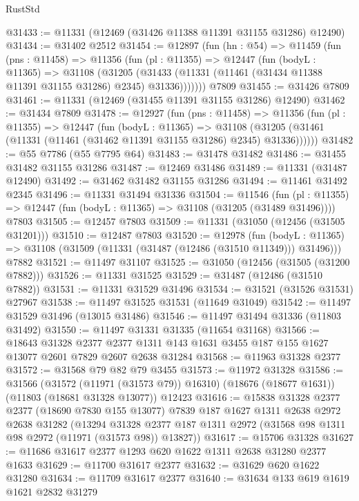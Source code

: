 \begin{lexlean}{RustStd}
\begin{coremodule}
@31433 := @11331 (@12469 (@31426 @11388 @11391 @31155 @31286) @12490)
@31434 := @31402 @2512
@31454 := @12897
    (fun (hn : @54) =>
    @11459
      (fun (pns : @11458) =>
      @11356
        (fun (pl : @11355) =>
        @12447
          (fun (bodyL : @11365) =>
          @31108
            (@31205
              (@31433 (@11331 (@11461 (@31434 @11388 @11391 @31155 @31286) @2345) @31336)))))))
    @7809
@31455 := @31426 @7809
@31461 := @11331 (@12469 (@31455 @11391 @31155 @31286) @12490)
@31462 := @31434 @7809
@31478 := @12927
    (fun (pns : @11458) =>
    @11356
      (fun (pl : @11355) =>
      @12447
        (fun (bodyL : @11365) =>
        @31108 (@31205 (@31461 (@11331 (@11461 (@31462 @11391 @31155 @31286) @2345) @31336))))))
@31482 := @55 @7786 (@55 @7795 @64)
@31483 := @31478 @31482
@31486 := @31455 @31482 @31155 @31286
@31487 := @12469 @31486
@31489 := @11331 (@31487 @12490)
@31492 := @31462 @31482 @31155 @31286
@31494 := @11461 @31492 @2345
@31496 := @11331 @31494 @31336
@31504 := @11546
    (fun (pl : @11355) => @12447 (fun (bodyL : @11365) => @31108 (@31205 (@31489 @31496))))
    @7803
@31505 := @12457 @7803
@31509 := @11331 (@31050 (@12456 (@31505 @31201)))
@31510 := @12487 @7803
@31520 := @12978
    (fun (bodyL : @11365) => @31108 (@31509 (@11331 (@31487 (@12486 (@31510 @11349))) @31496)))
    @7882
@31521 := @11497 @31107
@31525 := @31050 (@12456 (@31505 (@31200 @7882)))
@31526 := @11331 @31525
@31529 := @31487 (@12486 (@31510 @7882))
@31531 := @11331 @31529 @31496
@31534 := @31521 (@31526 @31531) @27967
@31538 := @11497 @31525 @31531 (@11649 @31049)
@31542 := @11497 @31529 @31496 (@13015 @31486)
@31546 := @11497 @31494 @31336 (@11803 @31492)
@31550 := @11497 @31331 @31335 (@11654 @31168)
@31566 := @18643
    @31328
    @2377
    @2377
    @1311
    @143
    @1631
    @3455
    @187
    @155
    @1627
    @13077
    @2601
    @7829
    @2607
    @2638
    @31284
@31568 := @11963 @31328 @2377
@31572 := @31568 @79 @82 @79 @3455
@31573 := @11972 @31328
@31586 := @31566
    (@31572 (@11971 (@31573 @79)) @16310)
    (@18676 (@18677 @1631))
    (@11803 (@18681 @31328 @13077))
    @12423
@31616 := @15838
    @31328
    @2377
    @2377
    (@18690 @7830 @155 @13077)
    @7839
    @187
    @1627
    @1311
    @2638
    @2972
    @2638
    @31282
    (@13294 @31328 @2377 @187 @1311 @2972 (@31568 @98 @1311 @98 @2972 (@11971 (@31573 @98)) @13827))
@31617 := @15706 @31328
@31627 := @11686 @31617 @2377 @1293 @620 @1622 @1311 @2638 @31280 @2377 @1633
@31629 := @11700 @31617 @2377
@31632 := @31629 @620 @1622 @31280
@31634 := @11709 @31617 @2377
@31640 := @31634 @133 @619 @1619 @1621 @2832 @31279

\end{coremodule}
\end{lexlean}
